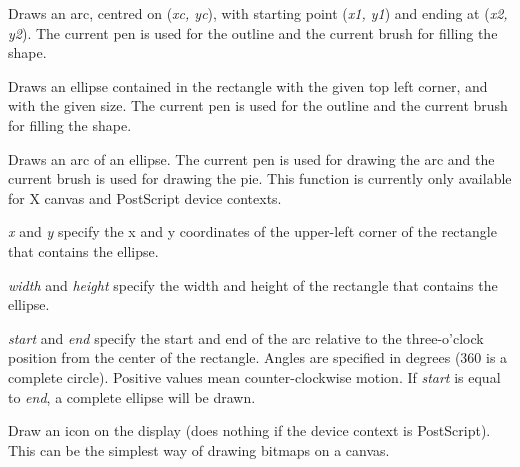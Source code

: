 
Draws an arc, centred on ({\it xc, yc}), with starting point ({\it x1, y1})
and ending at ({\it x2, y2}).   The current pen is used for the outline
and the current brush for filling the shape.



Draws an ellipse contained in the rectangle with the given top left corner, and with the
given size.  The current pen is used for the outline and the current brush for
filling the shape.



Draws an arc of an ellipse. The current pen is used for drawing the arc and 
the current brush is used for drawing the pie. This function is currently only available for
X canvas and PostScript device contexts.

{\it x} and {\it y} specify the x and y coordinates of the upper-left corner of the rectangle that contains
the ellipse.

{\it width} and {\it height} specify the width and height of the rectangle that contains 
the ellipse.

{\it start} and {\it end} specify the start and end of the arc relative to the three-o'clock
position from the center of the rectangle. Angles are specified
in degrees (360 is a complete circle). Positive values mean
counter-clockwise motion. If {\it start} is equal to {\it end}, a
complete ellipse will be drawn.

\label{wxdcdrawicon}


Draw an icon on the display (does nothing if the device context is PostScript).
This can be the simplest way of drawing bitmaps on a canvas.

\label{wxdcdrawline}


